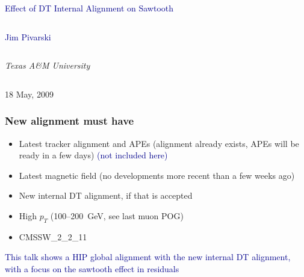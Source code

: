 \documentclass[compress]{beamer}
\begin{document}
\begin{frame}
\vfill
\begin{center}
\textcolor{darkblue}{\Large Effect of DT Internal Alignment on Sawtooth}

\vfill
\begin{columns}
\begin{center}
\large
\textcolor{darkblue}{Jim Pivarski}
\end{center}
\end{columns}

\begin{columns}
\begin{center}
\scriptsize
{\it Texas A\&M University}
\end{center}
\end{columns}

\vfill
18 May, 2009

\end{center}
\end{frame}


\small

\begin{frame}
\frametitle{New alignment must have}

\begin{itemize}
\item Latest tracker alignment and APEs (alignment already exists, APEs will be ready in a few days) \textcolor{darkblue}{(not included here)}
\item Latest magnetic field (no developments more recent than a few weeks ago)
\item New internal DT alignment, if that is accepted
\item High $p_T$ (100--200~GeV, see last muon POG)
\item CMSSW\_2\_2\_11
\end{itemize}

\vfill
\hspace{-0.83 cm} \textcolor{darkblue}{\Large This talk shows a HIP global alignment with the new internal DT alignment, with a focus on the sawtooth effect in residuals}
\end{frame}
\end{document}
